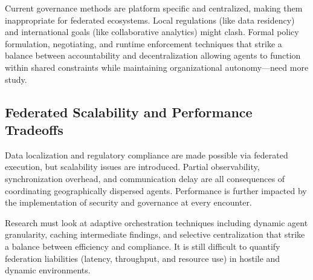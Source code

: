\documentclass[final,5p,times,twocolumn,authoryear,draft]{elsarticle}
\begin{document}
Current governance methods are platform specific and centralized, making them inappropriate for federated ecosystems. Local regulations (like data residency) and international goals (like collaborative analytics) might clash. Formal policy formulation, negotiating, and runtime enforcement techniques that strike a balance between accountability and decentralization allowing agents to function within shared constraints while maintaining organizational autonomy—need more study.



\subsection{Federated Scalability and Performance Tradeoffs}

Data localization and regulatory compliance are made possible via federated execution, but scalability issues are introduced. Partial observability, synchronization overhead, and communication delay are all consequences of coordinating geographically dispersed agents. Performance is further impacted by the implementation of security and governance at every encounter.

Research must look at adaptive orchestration techniques including dynamic agent granularity, caching intermediate findings, and selective centralization that strike a balance between efficiency and compliance. It is still difficult to quantify federation liabilities (latency, throughput, and resource use) in hostile and dynamic environments.

\end{document}
